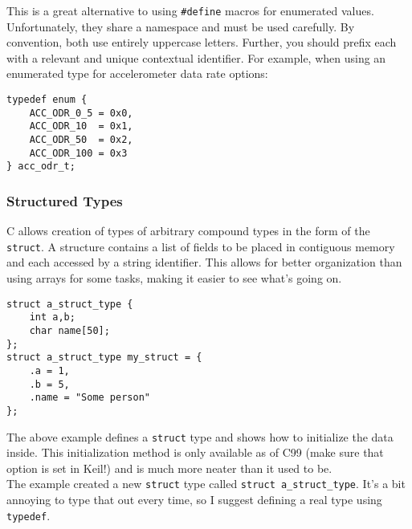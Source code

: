 \documentclass[10pt]{article}
\begin{document}
This is a great alternative to using \texttt{\#define} macros for enumerated values. Unfortunately, they share a namespace and must be used carefully. By convention, both use entirely uppercase letters. Further, you should prefix each with a relevant and unique contextual identifier. For example, when using an enumerated type for accelerometer data rate options:
\begin{lstlisting}[label=lst-enum-unique,caption=Unique naming of enumerated types]
typedef enum {
	ACC_ODR_0_5 = 0x0,
	ACC_ODR_10  = 0x1,
	ACC_ODR_50  = 0x2,
	ACC_ODR_100 = 0x3
} acc_odr_t;
\end{lstlisting}

\subsubsection{Structured Types}

C allows creation of types of arbitrary compound types in the form of the \texttt{struct}. A structure contains a list of fields to be placed in contiguous memory and each accessed by a string identifier. This allows for better organization than using arrays for some tasks, making it easier to see what's going on.
\begin{lstlisting}[label=lst-structures,caption=Structures]
struct a_struct_type {
	int a,b;
	char name[50];
};
struct a_struct_type my_struct = {
	.a = 1,
	.b = 5,
	.name = "Some person"
};
\end{lstlisting}
The above example defines a \texttt{struct} type and shows how to initialize the data inside. This initialization method is only available as of C99 (make sure that option is set in Keil!) and is much more neater than it used to be. \\

The example created a new \texttt{struct} type called \texttt{struct a\_struct\_type}. It's a bit annoying to type that out every time, so I suggest defining a real type using \texttt{typedef}. \\
\end{document}
